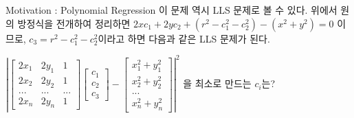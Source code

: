 \documentclass{beamer}
\begin{document}
\begin{frame}{Motivation : Polynomial Regression} 
이 문제 역시 LLS 문제로 볼 수 있다. 위에서 원의 방정식을 전개하여 정리하면 $2xc_1 + 2yc_2 + (r^2-c_1^2-c_2^2) - (x^2 + y^2) = 0$  이므로, $c_3 = r^2 -c_1^2-c_2^2$이라고 하면 다음과 같은 LLS 문제가 된다. 
\vspace{5mm}

$ \left| \left[ \begin{matrix} 
2x_1 & 2y_1 &  1 \\  
2x_2 & 2y_2 &  1 \\  
... & ... & ... \\
2x_n & 2y_n &  1 
\end{matrix} \right] \left[ \begin{matrix} 
c_1 \\
c_2 \\
c_3 \end{matrix} \right] - \left[ \begin{matrix}
x_1^2 + y_1^2 \\
x_2^2 + y_2^2 \\
...\\
x_n^2 + y_n^2 \end{matrix} \right] \right|^2 
$ 을 최소로 만드는 $c_i$는?

\end{frame}
\end{document}
